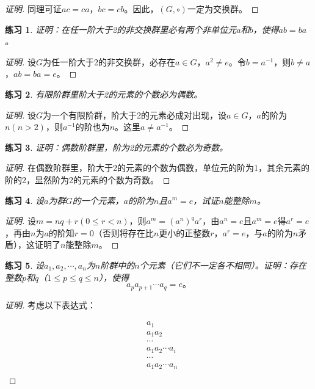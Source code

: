 \documentclass{article}
\newtheorem{Exercise}{练习}
\begin{document}
\begin{CJK*}{UTF8}{gbsn}
\begin{proof}[证明]
同理可证$ac=ca$，$bc=cb$。因此，$(G,\circ)$一定为交换群。
\end{proof}
\begin{Exercise}
  证明：在任一阶大于2的非交换群里必有两个非单位元$a$和$b$，使得$ab=ba$。
\end{Exercise}
\begin{proof}[证明]
  设$G$为任一阶大于2的非交换群，必存在$a\in G$，$a^2\neq e$。令$b=a^{-1}$，则$b\neq a$，$ab=ba=e$。
\end{proof}
\begin{Exercise}
  有限阶群里阶大于2的元素的个数必为偶数。
\end{Exercise}
\begin{proof}[证明]
  设$G$为一个有限阶群，阶大于2的元素必成对出现，设$a\in G$，$a$的阶为$n(n>2)$，则$a^{-1}$的阶也为$n$。这里$a\neq a^{-1}$。
\end{proof}
\begin{Exercise}
  证明：偶数阶群里，阶为2的元素的个数必为奇数。
\end{Exercise}
\begin{proof}[证明]
  在偶数阶群里，阶大于2的元素的个数为偶数，单位元的阶为1，其余元素的阶的2，显然阶为2的元素的个数为奇数。
\end{proof}
\begin{Exercise}
  设$a$为群$G$的一个元素，$a$的阶为$n$且$a^m=e$，试证$n$能整除$m$。
\end{Exercise}
\begin{proof}[证明]
  设$m=nq+r(0\leq r <n)$，则$a^m=(a^n)^qa^r$，由$a^n=e$且$a^m=e$得$a^r=e$，再由$n$为$a$的阶知$r=0$（否则将存在比$n$更小的正整数$r$，$a^r=e$，与$a$的阶为$n$矛盾），这证明了$n$能整除$m$。
\end{proof}
\begin{Exercise}
  设$a_1,a_2,\cdots,a_n$为$n$阶群中的$n$个元素（它们不一定各不相同）。证明：存在整数$p$和$q$（$1\leq p \leq q \leq n$），使得
  \[a_pa_{p+1}\cdots a_q=e\text{。}\]
\end{Exercise}
\begin{proof}[证明]
  考虑以下表达式：

  \begin{align*}
    &a_1\\
    &a_1a_2\\
    &\cdots\\
    &a_1a_2\cdots a_i\\
    &\cdots\\
    &a_1a_2\cdots a_n\\
  \end{align*}


\end{proof}
\end{CJK*}
\end{document}

